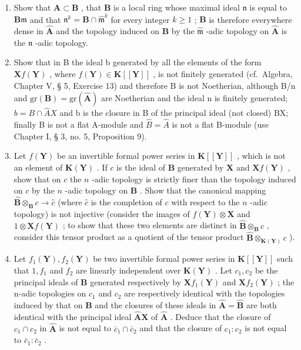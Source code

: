 \begin{enumerate}
\def\labelenumi{(\alph{enumi})}
\item
  Show that \(\mathbf{A} \subset \mathbf{B}\) , that \(\mathbf{B}\) is a local ring whose maximal ideal \(\mathfrak{n}\) is equal to \(\mathbf{B}\mathfrak{m}\) and that \(\mathfrak{n}^k = \mathbf{B} \cap \hat{\mathfrak{m}}^k\) for every integer \(k \geqslant 1\) ; \(\mathbf{B}\) is therefore everywhere dense in \(\hat{\mathbf{A}}\) and the topology induced on \(\mathbf{B}\) by the \(\hat{\mathfrak{m}}\) -adic topology on \(\hat{\mathbf{A}}\) is the \(\mathfrak{n}\) -adic topology.
\item
  Show that in B the ideal b generated by all the elements of the form \(\mathbf{X}f(\mathbf{Y})\) , where \(f(\mathbf{Y}) \in \mathbf{K}[[\mathbf{Y}]]\) , is not finitely generated (cf.~Algebra, Chapter V, § 5, Exercise 13) and therefore B is not Noetherian, although B/n and \(\mathrm{gr}(\mathbf{B}) = \mathrm{gr}(\hat{\mathbf{A}})\) are Noetherian and the ideal n is finitely generated; \(b = B \cap \hat{A}X\) and b is the closure in B of the principal ideal (not closed) BX; finally B is not a flat A-module and \(\hat{B} = \hat{A}\) is not a flat B-module (use Chapter I, § 3, no. 5, Proposition 9).
\item
  Let \(f(\mathbf{Y})\) be an invertible formal power series in \(\mathbf{K}[[\mathbf{Y}]]\) , which is not an element of \(\mathbf{K}(\mathbf{Y})\) . If \(c\) is the ideal of \(\mathbf{B}\) generated by \(\mathbf{X}\) and \(\mathbf{X}f(\mathbf{Y})\) , show that on \(c\) the \(n\) -adic topology is strictly finer than the topology induced on \(c\) by the \(n\) -adic topology on \(\mathbf{B}\) . Show that the canonical mapping \(\hat{\mathbf{B}} \otimes_{\mathbf{B}} c \to \hat{c}\) (where \(\hat{c}\) is the completion of \(c\) with respect to the \(n\) -adic topology) is not injective (consider the images of \(f(\mathbf{Y}) \otimes \mathbf{X}\) and \(1 \otimes \mathbf{X}f(\mathbf{Y})\) ; to show that these two elements are distinct in \(\hat{\mathbf{B}} \otimes_{\mathbf{B}} c\) , consider this tensor product as a quotient of the tensor product \(\hat{\mathbf{B}} \otimes_{\mathbf{K}(\mathbf{Y})} c\) ).
\item
  Let \(f_{1}(\mathbf{Y}), f_{2}(\mathbf{Y})\) be two invertible formal power series in \(\mathbf{K}[[\mathbf{Y}]]\) such that \(1, f_{1}\) and \(f_{2}\) are linearly independent over \(\mathbf{K}(\mathbf{Y})\) . Let \(c_{1}, c_{2}\) be the principal ideals of \(\mathbf{B}\) generated respectively by \(\mathbf{X}f_{1}(\mathbf{Y})\) and \(\mathbf{X}f_{2}(\mathbf{Y})\) ; the n-adic topologies on \(c_{1}\) and \(c_{2}\) are respectively identical with the topologies induced by that on \(\mathbf{B}\) and the closures of these ideals in \(\hat{\mathbf{A}} = \hat{\mathbf{B}}\) are both identical with the principal ideal \(\hat{\mathbf{A}}\mathbf{X}\) of \(\hat{\mathbf{A}}\) . Deduce that the closure of \(c_{1} \cap c_{2}\) in \(\hat{\mathbf{A}}\) is not equal to \(\bar{c}_{1} \cap \bar{c}_{2}\) and that the closure of \(c_{1}: c_{2}\) is not equal to \(\bar{c}_{1}: \bar{c}_{2}\) .
\end{enumerate}

